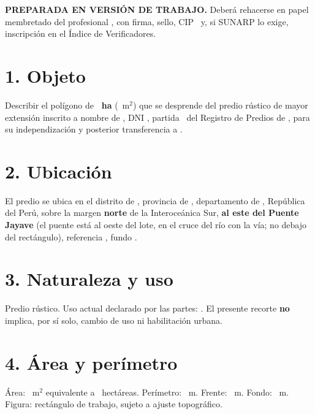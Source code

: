 \documentclass[12pt,a4paper]{article}
\begin{document}


\noindent \textbf{PREPARADA EN VERSIÓN DE TRABAJO.} Deberá rehacerse en papel membretado del profesional \IngenieroNombre, con firma, sello, CIP \IngenieroCIP\ y, si SUNARP lo exige, inscripción en el Índice de Verificadores.

\section*{1. Objeto}
Describir el polígono de \textbf{\AreaIndependizarHa\ ha} (\AreaIndependizarMetros\ m$^2$) que se desprende del predio rústico de mayor extensión inscrito a nombre de \VendedorNombreCompleto, DNI \VendedorDNI, partida \PartidaMatriz\ del Registro de Predios de \OficinaRegistral, para su independización y posterior transferencia a \CompradorNombreCompleto.

\section*{2. Ubicación}
El predio se ubica en el distrito de \Distrito, provincia de \Provincia, departamento de \Departamento, República del Perú, sobre la margen \textbf{norte} de la Interoceánica Sur, \textbf{al este del Puente Jayave} (el puente está al oeste del lote, en el cruce del río con la vía; no debajo del rectángulo), referencia \KmCarretera, fundo \NombreFundo.

\section*{3. Naturaleza y uso}
Predio rústico. Uso actual declarado por las partes: . El presente recorte \textbf{no} implica, por sí solo, cambio de uso ni habilitación urbana.

\section*{4. Área y perímetro}
Área: \AreaIndependizarMetros\ m$^2$ equivalente a \AreaIndependizarHa\ hectáreas. Perímetro: \PerimetroM\ m. Frente: \FrenteM\ m. Fondo: \FondoM\ m. Figura: rectángulo de trabajo, sujeto a ajuste topográfico.
\end{document}
